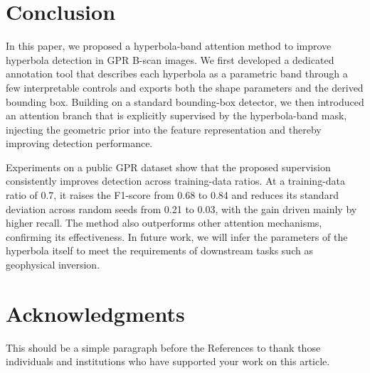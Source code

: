 \documentclass[lettersize,journal]{IEEEtran}
\begin{document}
\section{Conclusion}
In this paper, we proposed a hyperbola-band attention method to improve hyperbola
detection in GPR B-scan images.
We first developed a dedicated annotation tool
that describes each hyperbola as a parametric band through a few interpretable
controls and exports both the shape parameters and the derived bounding box.
Building on a standard bounding-box detector, we then introduced an attention
branch that is explicitly supervised by the hyperbola-band mask, injecting the
geometric prior into the feature representation and thereby improving detection
performance.

Experiments on a public GPR dataset show that the proposed supervision
consistently improves detection across training-data ratios. At a training-data
ratio of 0.7, it raises the F1-score from 0.68 to 0.84 and reduces its standard
deviation across random seeds from 0.21 to 0.03, with the gain driven mainly by
higher recall. The method also outperforms other attention mechanisms, confirming
its effectiveness. In future work, we will infer the parameters of the hyperbola
itself to meet the requirements of downstream tasks such as geophysical
inversion.



\section*{Acknowledgments}
This should be a simple paragraph before the References to thank those individuals and institutions who have supported your work on this article.



\end{document}
